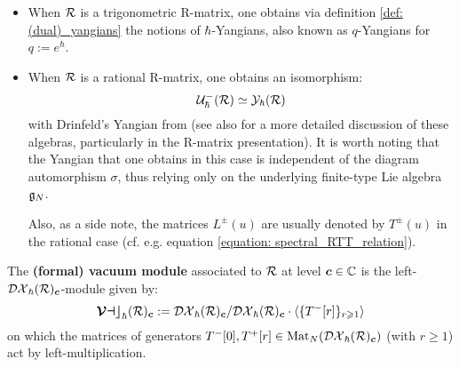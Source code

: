         \begin{example} \label{example: trigonometric_and_rational_(dual)_yangians}
            \begin{itemize}
                \item When $\mathcal{R}$ is a trigonometric R-matrix, one obtains via definition \ref{def: (dual)_yangians} the notions of $\hbar$-Yangians, also known as $q$-Yangians for $q := e^{\hbar}$.  
                \item When $\mathcal{R}$ is a rational R-matrix, one obtains an isomorphism:
                    $$\mathcal{U}^-_{\hbar}(\mathcal{R}) \simeq \mathcal{Y}_{\hbar}(\mathcal{R})$$
                with Drinfeld's Yangian from \cite{drinfeld_original_yangian_paper} (see also \cite[Chapter 1]{molev_yangians_and_classical_lie_algebras} for a more detailed discussion of these algebras, particularly in the R-matrix presentation). It is worth noting that the Yangian that one obtains in this case is independent of the diagram automorphism $\sigma$, thus relying only on the underlying finite-type Lie algebra $\mathfrak{g}_N$.

                Also, as a side note, the matrices $L^{\pm}(u)$ are usually denoted by $T^{\pm}(u)$ in the rational case (cf. e.g. equation \eqref{equation: spectral_RTT_relation}).
            \end{itemize}
        \end{example}
        \begin{definition} \label{def: vacuum_modules}
            The \textbf{(formal) vacuum module} associated to $\mathcal{R}$ at level $\boldsymbol{c} \in \mathbb{C}$ is the left-$\mathcal{DX}_{\hbar}(\mathcal{R})_{\boldsymbol{c}}$-module given by:
                $$\boldsymbol{ \mathcal{Vac} }_{\hbar}(\mathcal{R})_{\boldsymbol{c}} := \mathcal{DX}_{\hbar}(\mathcal{R})_{\boldsymbol{c}}/\mathcal{DX}_{\hbar}(\mathcal{R})_{\boldsymbol{c}} \cdot \langle \{ T^-[r] \}_{r \geqslant 1} \rangle$$
            on which the matrices of generators $T^-[0], T^+[r] \in \operatorname{Mat}_N( \mathcal{DX}_{\hbar}(\mathcal{R})_{\boldsymbol{c}} )$ (with $r \geq 1$) act by left-multiplication.
        \end{definition}

